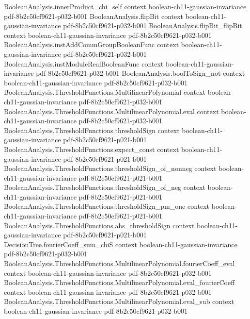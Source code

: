 \begin{theorem}
\proofstep
  {BooleanAnalysis.innerProduct_chi_self}
  {context}
  {boolean-ch11-gaussian-invariance}
  {pdf-8b2c50cf9621-p032-b001}
\proofstep
  {BooleanAnalysis.flipBit}
  {context}
  {boolean-ch11-gaussian-invariance}
  {pdf-8b2c50cf9621-p032-b001}
\proofstep
  {BooleanAnalysis.flipBit_flipBit}
  {context}
  {boolean-ch11-gaussian-invariance}
  {pdf-8b2c50cf9621-p032-b001}
\proofstep
  {BooleanAnalysis.instAddCommGroupBooleanFunc}
  {context}
  {boolean-ch11-gaussian-invariance}
  {pdf-8b2c50cf9621-p032-b001}
\proofstep
  {BooleanAnalysis.instModuleRealBooleanFunc}
  {context}
  {boolean-ch11-gaussian-invariance}
  {pdf-8b2c50cf9621-p032-b001}
\proofstep
  {BooleanAnalysis.boolToSign_not}
  {context}
  {boolean-ch11-gaussian-invariance}
  {pdf-8b2c50cf9621-p032-b001}
\proofstep
  {BooleanAnalysis.ThresholdFunctions.MultilinearPolynomial}
  {context}
  {boolean-ch11-gaussian-invariance}
  {pdf-8b2c50cf9621-p032-b001}
\proofstep
  {BooleanAnalysis.ThresholdFunctions.MultilinearPolynomial.eval}
  {context}
  {boolean-ch11-gaussian-invariance}
  {pdf-8b2c50cf9621-p032-b001}
\proofstep
  {BooleanAnalysis.ThresholdFunctions.thresholdSign}
  {context}
  {boolean-ch11-gaussian-invariance}
  {pdf-8b2c50cf9621-p021-b001}
\proofstep
  {BooleanAnalysis.ThresholdFunctions.expect_const}
  {context}
  {boolean-ch11-gaussian-invariance}
  {pdf-8b2c50cf9621-p021-b001}
\proofstep
  {BooleanAnalysis.ThresholdFunctions.thresholdSign_of_nonneg}
  {context}
  {boolean-ch11-gaussian-invariance}
  {pdf-8b2c50cf9621-p021-b001}
\proofstep
  {BooleanAnalysis.ThresholdFunctions.thresholdSign_of_neg}
  {context}
  {boolean-ch11-gaussian-invariance}
  {pdf-8b2c50cf9621-p021-b001}
\proofstep
  {BooleanAnalysis.ThresholdFunctions.thresholdSign_pm_one}
  {context}
  {boolean-ch11-gaussian-invariance}
  {pdf-8b2c50cf9621-p021-b001}
\proofstep
  {BooleanAnalysis.ThresholdFunctions.abs_thresholdSign}
  {context}
  {boolean-ch11-gaussian-invariance}
  {pdf-8b2c50cf9621-p021-b001}
\proofstep
  {DecisionTree.fourierCoeff_sum_chiS}
  {context}
  {boolean-ch11-gaussian-invariance}
  {pdf-8b2c50cf9621-p032-b001}
\proofstep
  {BooleanAnalysis.ThresholdFunctions.MultilinearPolynomial.fourierCoeff_eval}
  {context}
  {boolean-ch11-gaussian-invariance}
  {pdf-8b2c50cf9621-p032-b001}
\proofstep
  {BooleanAnalysis.ThresholdFunctions.MultilinearPolynomial.eval_fourierCoeff}
  {context}
  {boolean-ch11-gaussian-invariance}
  {pdf-8b2c50cf9621-p032-b001}
\proofstep
  {BooleanAnalysis.ThresholdFunctions.MultilinearPolynomial.eval_sub}
  {context}
  {boolean-ch11-gaussian-invariance}
  {pdf-8b2c50cf9621-p032-b001}

\end{theorem}

